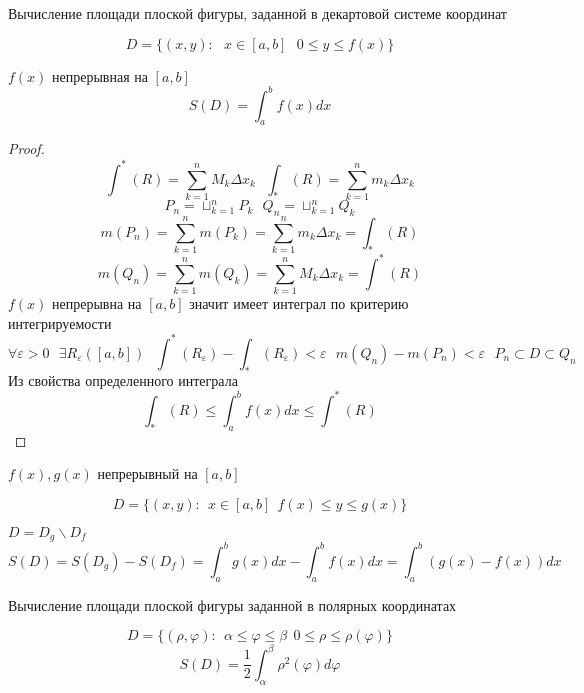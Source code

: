 \begin{title}[\Large]
  Вычисление площади плоской фигуры, заданной в декартовой системе координат
\end{title}

\begin{defin}
 $$
  D = \{ (x,y): ~~~ x \in [a,b]  ~~~ 0 \le y \le f(x) \}
 $$
\end{defin}

\begin{theorem}
  $f(x)$ непрерывная на $[a,b]$
  $$
  S(D) = \int_a^b f(x) dx
  $$
\end{theorem}

\begin{proof}
  $$
  \int^* (R) = \sum_{k=1}^n M_k \Delta x_k ~~~
  \int_* (R) = \sum_{k=1}^n m_k \Delta x_k
  $$
  $$
  P_n = \sqcup_{k=1}^n P_k ~~~
  Q_n = \sqcup_{k=1}^n Q_k
  $$
  $$
  m(P_n) = \sum_{k=1}^n m(P_k) = \sum_{k=1}^n m_k \Delta x_k = \int_* (R)
  $$
  $$
  m(Q_n) = \sum_{k=1}^n m(Q_k) = \sum_{k=1}^n M_k \Delta x_k = \int^* (R)
  $$
  $f(x)$ непрерывна на $[a,b]$ значит имеет интеграл по критерию интегрируемости
  $$
  \forall \varepsilon > 0 ~~~
  \exists R_{\varepsilon} ([a,b]) ~~~
  \int^*(R_{\varepsilon}) - \int_* (R_{\varepsilon}) < \varepsilon ~~~
  m(Q_n) - m(P_n) < \varepsilon ~~~
  P_n \subset D \subset Q_n
  $$
  Из свойства определенного интеграла
  $$
  \int_* (R) \le \int_a^b f(x)dx \le \int^* (R)
  $$
\end{proof}

\begin{theorem}
  $f(x),g(x)$ непрерывный на $[a,b]$

  $$
  D = \{ (x,y): ~~ x \in [a,b] ~~ f(x) \le y \le g(x) \}
  $$

  $D = D_g \backslash D_f$
  $$
  S(D) = S(D_g) - S(D_f) = \int_a^b g(x)dx - \int_a^b f(x)dx =
  \int_a^b (g(x) - f(x)) dx
  $$
\end{theorem}

\begin{title}[\Large]
  Вычисление площади плоской фигуры заданной в полярных координатах
\end{title}

\begin{theorem}
  $$
  D = \{ (\rho,\varphi): ~~ \alpha \le \varphi \le \beta ~~ 0 \le
  \rho \le \rho(\varphi) \}
  $$
  $$
  S(D) = \frac{1}{2} \int_{\alpha}^{\beta} \rho^2(\varphi) d\varphi
  $$
\end{theorem}

